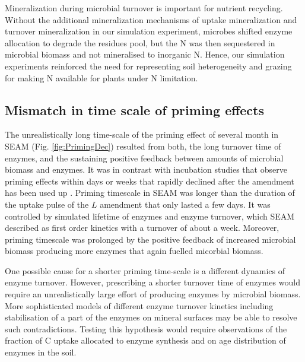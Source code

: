 Mineralization during microbial turnover is important for nutrient recycling.
Without the additional mineralization mechanisms of uptake mineralization
\citep{Manzoni08} and turnover mineralization \citep{Clarholm85, Raynaud06} in
our simulation experiment, microbes shifted enzyme allocation to degrade the
residues pool, but the N was then sequestered in microbial biomass and not
mineralised to inorganic N. Hence, our simulation experiments reinforced the
need for representing soil heterogeneity and grazing for making N available for
plants under N limitation.

\subsection{Mismatch in time scale of priming effects}
The unrealistically long time-scale of the priming effect of several month in
SEAM (Fig. \ref{fig:PrimingDec}) resulted from both, the long turnover time of
enzymes, and the sustaining positive feedback between amounts of microbial
biomass and enzymes. It was in contrast with incubation studies that observe
priming effects within days or weeks that rapidly declined after the amendment
has been used up \citep{Blagodatskaya14}.
Priming timescale in SEAM was longer than the duration of the uptake pulse of
the $L$ amendment that only lasted a few days. It was controlled by simulated
lifetime of enzymes and enzyme turnover, which SEAM described as first order
kinetics with a turnover of about a week. Moreover, priming timescale was
prolonged by the positive feedback of increased microbial biomass producing more
enzymes that again fuelled micorbial biomass.


One possible cause for a shorter priming time-scale is a different dynamics of
enzyme turnover. However, prescribing a shorter turnover time of enzymes would
require an unrealistically large effort of producing enzymes by microbial
biomass. More sophisticated models of different enzyme turnover kinetics
including stabilisation of a part of the enzymes on mineral surfaces
\citep{Burns13} may be able to resolve such contradictions. Testing this
hypothesis would require observations of the fraction of C uptake allocated to
enzyme synthesis and on age distribution of enzymes in the soil.  

